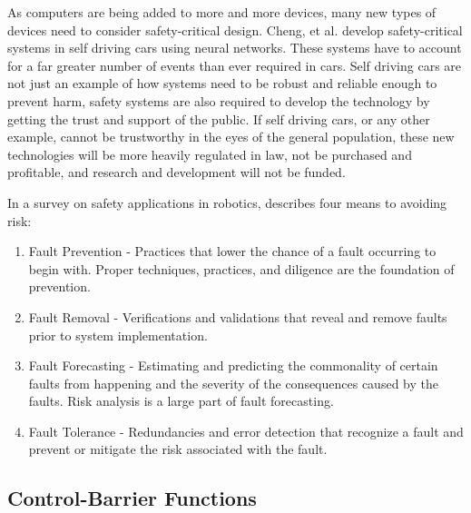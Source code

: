 As computers are being added to more and more devices, many new types of devices need to consider safety-critical design. Cheng, et al. \cite{cheng2019nn} develop safety-critical systems in self driving cars using neural networks. These systems have to account for a far greater number of events than ever required in cars. Self driving cars are not just an example of how systems need to be robust and reliable enough to prevent harm, safety systems are also required to develop the technology by getting the trust and support of the public. If self driving cars, or any other example, cannot be trustworthy in the eyes of the general population, these new technologies will be more heavily regulated in law, not be purchased and profitable, and research and development will not be funded.

In a survey on safety applications in robotics, \cite{guiochet2017safety} describes four means to avoiding risk:

\begin{enumerate}
    \item Fault Prevention - Practices that lower the chance of a fault occurring to begin with. Proper techniques, practices, and diligence are the foundation of prevention.
    \item Fault Removal - Verifications and validations that reveal and remove faults prior to system implementation.
    \item Fault Forecasting - Estimating and predicting the commonality of certain faults from happening and the severity of the consequences caused by the faults. Risk analysis is a large part of fault forecasting.
    \item Fault Tolerance - Redundancies and error detection that recognize a fault and prevent or mitigate the risk associated with the fault.
\end{enumerate}

\subsection{Control-Barrier Functions}

